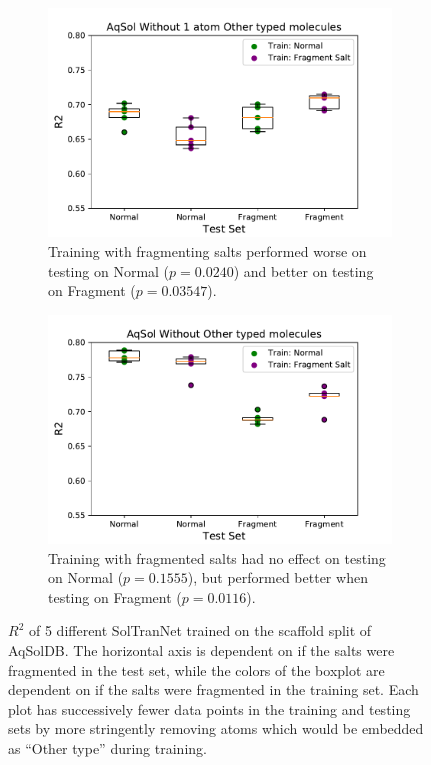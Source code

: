 \documentclass[journal=jcisd8,manuscript=article]{achemso}
\begin{document}
\begin{figure}[tb]
    \begin{subfigure}[t]{0.48\textwidth}
        \centering
        \includegraphics[width=\linewidth]{figures/others2plus_saltfragfirst_R2s_boxplots.pdf}
        \caption{Training with fragmenting salts performed worse on testing on Normal ($p=0.0240$) and better on testing on Fragment ($p=0.03547$).}
        \label{fig:onesfr2}
    \end{subfigure}%
    \hfill
    \begin{subfigure}[t]{0.48\textwidth}
        \centering
        \includegraphics[width=\linewidth]{figures/noothers_saltfragfirst_R2s_boxplots.pdf}
        \caption{Training with fragmented salts had no effect on testing on Normal ($p=0.1555$), but performed better when testing on Fragment ($p=0.0116$).}
        \label{fig:noothersdf2}
    \end{subfigure}
    \caption{$R^2$ of 5 different SolTranNet trained on the scaffold split of AqSolDB. The horizontal axis is dependent on if the salts were fragmented in the test set, while the colors of the boxplot are dependent on if the salts were fragmented in the training set. Each plot has successively fewer data points in the training and testing sets by more stringently removing atoms which would be embedded as ``Other type'' during training.}
    \label{fig:saltfragr2}
\end{figure}
\end{document}
